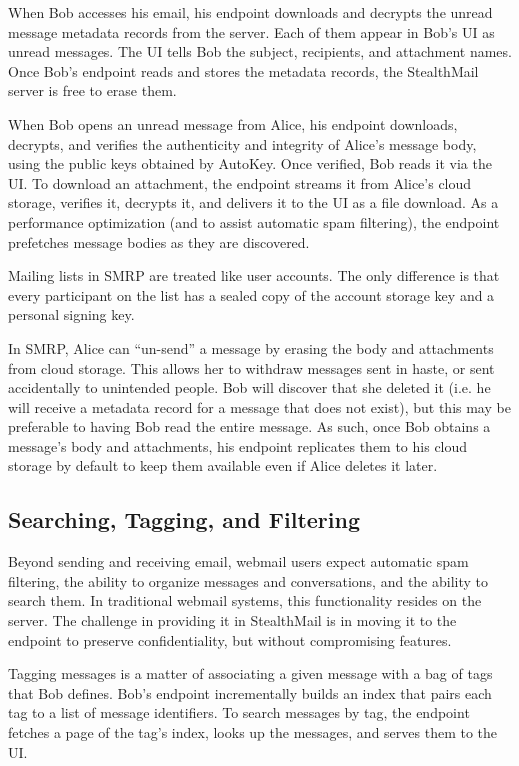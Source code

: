 When Bob accesses his email, his endpoint downloads and decrypts the unread message metadata records from the server.  Each of them appear in Bob's UI as unread messages. The UI tells Bob the subject, recipients, and attachment names.  Once Bob's endpoint reads and stores the metadata records, the StealthMail server is free to erase them.  

When Bob opens an unread message from Alice, his endpoint downloads, decrypts, and verifies the authenticity and integrity of Alice's message body, using the public keys obtained by AutoKey. Once verified, Bob reads it via the UI. To download an attachment, the endpoint streams it from Alice's cloud storage, verifies it, decrypts it, and delivers it to the UI as a file download.  As a performance optimization (and to assist automatic spam filtering), the endpoint prefetches message bodies as they are discovered.

Mailing lists in SMRP are treated like user accounts.  The only difference is that every participant on the list has a sealed copy of the account storage key and a personal signing key.

In SMRP, Alice can ``un-send'' a message by erasing the body and attachments from cloud storage.  This allows her to withdraw messages sent in haste, or sent accidentally to unintended people.  Bob will discover that she deleted it (i.e. he will receive a metadata record for a message that does not exist), but this may be preferable to having Bob read the entire message.  As such, once Bob obtains a message’s body and attachments, his endpoint replicates them to his cloud storage by default to keep them available even if Alice deletes it later.

\subsection{Searching, Tagging, and Filtering}
Beyond sending and receiving email, webmail users expect automatic spam filtering, the ability to organize messages and conversations, and the ability to search them.  In traditional webmail systems, this functionality resides on the server.  The challenge in providing it in StealthMail is in moving it to the endpoint to preserve confidentiality, but without compromising features.

Tagging messages is a matter of associating a given message with a bag of tags that Bob defines.  Bob’s endpoint incrementally builds an index that pairs each tag to a list of message identifiers.  To search messages by tag, the endpoint fetches a page of the tag’s index, looks up the messages, and serves them to the UI.

